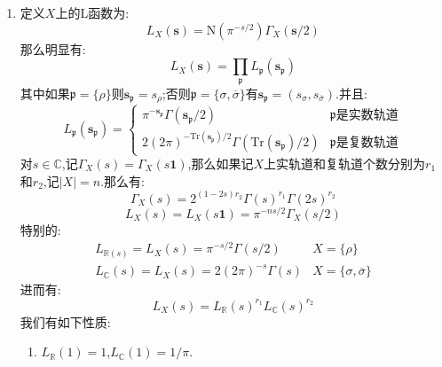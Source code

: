\begin{enumerate}
\begin{proof}
		做乘积分解,问题归结为设$X$上的$G$作用是可迁的.如果$X$是单元集合,那么明显有$\Gamma_X(\textbf{s})=\Gamma(s)$.设$X=\{\tau,\overline{\tau}\}$是二元集合.考虑映射:
		$$\psi:\mathbb{R}_+^*\to\textbf{R}_+^*$$
		$$t\mapsto\left(\sqrt{t},\sqrt{t}\right)$$
		于是有:
		\begin{align*}
			\int_{\textbf{R}_+^*}\mathrm{N}\left(e^{-y}y^{\textbf{s}}\right)\frac{\mathrm{d}y}{y}\\&=\int_{\mathbb{R}_+^*}\mathrm{N}\left(e^{-(\sqrt{t},\sqrt{t})}(\sqrt{t},\sqrt{t})^{s_{\tau},s_{\overline{\tau}}}\right)\frac{\mathrm{d}t}{t}\\&=\int_0^{\infty}e^{-2\sqrt{t}}\sqrt{t}^{\mathrm{Tr}(\textbf{s})}\frac{\mathrm{d}t}{t}
		\end{align*}
		做代换$t\mapsto(t/2)^2$得到:
		$$\int_{\textbf{R}_+^*}\mathrm{N}(e^{-y}y^{\textbf{s}})\frac{\mathrm{d}y}{y}=2^{1-\mathrm{Tr}(\textbf{s})}\Gamma(\mathrm{Tr}(\textbf{s}))$$
	\end{proof}
    \item 定义$X$上的L函数为:
    $$L_X(\textbf{s})=\mathrm{N}(\pi^{-s/2})\Gamma_X(\textbf{s}/2)$$
    那么明显有:
    $$L_X(\textbf{s})=\prod_{\mathfrak{p}}L_{\mathfrak{p}}(\textbf{s}_{\mathfrak{p}})$$
    其中如果$\mathfrak{p}=\{\rho\}$则$\textbf{s}_{\mathfrak{p}}=s_{\rho}$;否则$\mathfrak{p}=\{\sigma,\overline{\sigma}\}$有$\textbf{s}_{\mathfrak{p}}=(s_{\sigma},s_{\overline{\sigma}})$.并且:
    $$L_{\mathfrak{p}}(\textbf{s}_{\mathfrak{p}})=\left\{\begin{array}{cc}\pi^{-\textbf{s}_{\mathfrak{p}}}\Gamma(\textbf{s}_{\mathfrak{p}}/2)&\mathfrak{p}\text{是实数轨道}\\2(2\pi)^{-\mathrm{Tr}(\textbf{s}_{\mathfrak{p}})/2}\Gamma(\mathrm{Tr}(\textbf{s}_{\mathfrak{p}})/2)&\mathfrak{p}\text{是复数轨道}\end{array}\right.$$
    对$s\in\mathbb{C}$,记$\Gamma_X(s)=\Gamma_X(s\textbf{1})$,那么如果记$X$上实轨道和复轨道个数分别为$r_1$和$r_2$,记$|X|=n$.那么有:
    $$\Gamma_X(s)=2^{(1-2s)r_2}\Gamma(s)^{r_1}\Gamma(2s)^{r_2}$$
    $$L_X(s)=L_X(s\textbf{1})=\pi^{-ns/2}\Gamma_X(s/2)$$
    特别的:
    $$\begin{array}{cc}L_{\mathbb{R}(s)}=L_X(s)=\pi^{-s/2}\Gamma(s/2)&X=\{\rho\}\\L_{\mathbb{C}}(s)=L_X(s)=2(2\pi)^{-s}\Gamma(s)&X=\{\sigma,\overline{\sigma}\}\end{array}$$
    进而有:
    $$L_X(s)=L_{\mathbb{R}}(s)^{r_1}L_{\mathbb{C}}(s)^{r_2}$$
    我们有如下性质:
    \begin{enumerate}[(1)]
    	\item $L_{\mathbb{R}}(1)=1$,$L_{\mathbb{C}}(1)=1/\pi$.

\end{enumerate}
\end{enumerate}
